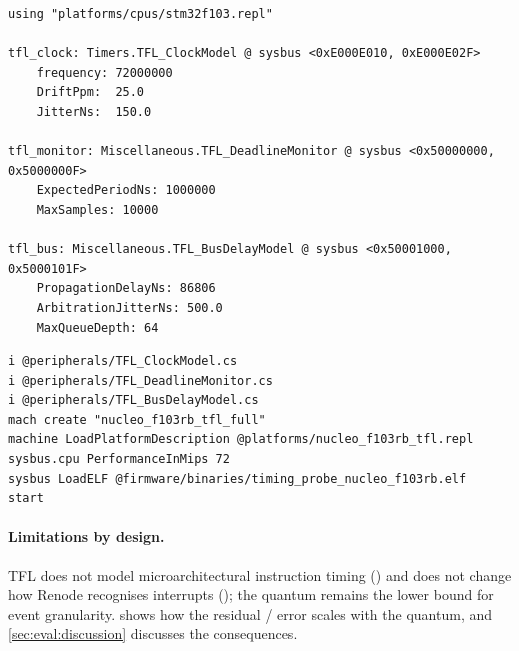 \begin{lstlisting}[language=repl, caption={TFL platform description
  (\texttt{platforms/nucleo\_f103rb\_tfl.repl}). The base STM32F103
  description is included unchanged; TFL components are added at
  dedicated addresses.}, label={lst:repl}]
using "platforms/cpus/stm32f103.repl"

tfl_clock: Timers.TFL_ClockModel @ sysbus <0xE000E010, 0xE000E02F>
    frequency: 72000000
    DriftPpm:  25.0
    JitterNs:  150.0

tfl_monitor: Miscellaneous.TFL_DeadlineMonitor @ sysbus <0x50000000, 0x5000000F>
    ExpectedPeriodNs: 1000000
    MaxSamples: 10000

tfl_bus: Miscellaneous.TFL_BusDelayModel @ sysbus <0x50001000, 0x5000101F>
    PropagationDelayNs: 86806
    ArbitrationJitterNs: 500.0
    MaxQueueDepth: 64
\end{lstlisting}

\begin{lstlisting}[language=resc, caption={Renode execution script
  (\texttt{scripts/tfl\_full.resc}). The \texttt{i} directive compiles
  and loads the TFL C\# sources at runtime---Renode itself is never
  rebuilt.}, label={lst:resc}]
i @peripherals/TFL_ClockModel.cs
i @peripherals/TFL_DeadlineMonitor.cs
i @peripherals/TFL_BusDelayModel.cs
mach create "nucleo_f103rb_tfl_full"
machine LoadPlatformDescription @platforms/nucleo_f103rb_tfl.repl
sysbus.cpu PerformanceInMips 72
sysbus LoadELF @firmware/binaries/timing_probe_nucleo_f103rb.elf
start
\end{lstlisting}

\paragraph{Limitations by design.} TFL does not model
microarchitectural instruction timing () and does not change
how Renode recognises interrupts (); the quantum remains the
lower bound for event granularity.  shows how
the residual / error scales with the quantum, and
\cref{sec:eval:discussion} discusses the consequences.
